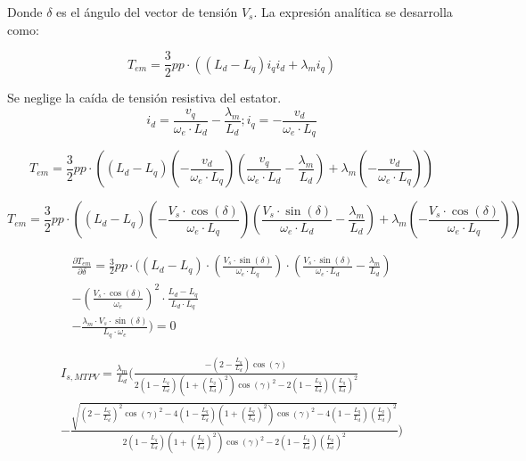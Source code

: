 Donde $\delta$ es el ángulo del vector de tensión $V_s$. La expresión analítica se desarrolla como:

\begin{equation}
T_{em} = \frac{3}{2}pp\cdot((L_d - L_q) i_q i_d + \lambda_m i_q)
\end{equation}

Se neglige la caída de tensión resistiva del estator. 
\begin{equation}
i_d = \frac{v_q}{\omega_e \cdot L_d} - \frac{\lambda_m}{L_d}; i_q = -\frac{v_d}{\omega_e \cdot L_q}
\end{equation}

\begin{equation}
T_{em} = \frac{3}{2}pp\cdot\left((L_d - L_q) (-\frac{v_d}{\omega_e \cdot L_q}) (\frac{v_q}{\omega_e \cdot L_d} - \frac{\lambda_m}{L_d}) + \lambda_m (-\frac{v_d}{\omega_e \cdot L_q})\right)
\end{equation}

\begin{equation}
T_{em} = \frac{3}{2}pp\cdot\left((L_d - L_q) (-\frac{V_s \cdot \cos(\delta)}{\omega_e \cdot L_q}) (\frac{V_s \cdot \sin(\delta)}{\omega_e \cdot L_d} - \frac{\lambda_m}{L_d}) + \lambda_m (-\frac{V_s \cdot \cos(\delta)}{\omega_e \cdot L_q})\right)
\end{equation}

\begin{equation}
\begin{split}
\frac{\partial T_{em}}{\partial \delta} = \frac{3}{2}pp\cdot (
(L_d - L_q) \cdot (\frac{V_s \cdot \sin(\delta)}{\omega_e \cdot L_q}) \cdot (\frac{V_s \cdot \sin(\delta)}{\omega_e \cdot L_d} - \frac{\lambda_m}{L_d})\\
-\left(\frac{V_s \cdot \cos(\delta)}{\omega_e}\right)^2 \cdot \frac{L_d - L_q}{L_d\cdot L_q}\\ 
-\frac{\lambda_m \cdot V_s \cdot \sin(\delta)}{L_q \cdot \omega_e} ) = 0
\end{split}
\end{equation}


\begin{equation}
\begin{split}
I_{s,MTPV} = \frac{\lambda_m}{L_d} ( \frac{-(2 - \frac{L_q}{L_d}) \cos(\gamma)}{2(1 - \frac{L_q}{L_d})(1 + (\frac{L_q}{L_d})^2) \cos(\gamma)^2 - 2(1 - \frac{L_q}{L_d}) (\frac{L_q}{L_d})^2}\\
-\frac{\sqrt{(2 - \frac{L_q}{L_d})^2 \cos(\gamma)^2 - 4(1 - \frac{L_q}{L_d})(1 + (\frac{L_q}{L_d})^2) \cos(\gamma)^2 - 4(1 - \frac{L_q}{L_d}) (\frac{L_q}{L_d})^2}}{2(1 - \frac{L_q}{L_d})(1 + (\frac{L_q}{L_d})^2) \cos(\gamma)^2 - 2(1 - \frac{L_q}{L_d}) (\frac{L_q}{L_d})^2} )
\end{split}
\end{equation}




